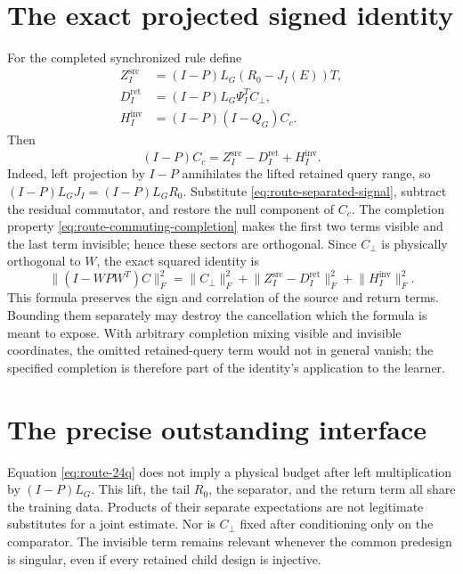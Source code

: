 \documentclass[11pt,oneside,openany,a4paper]{report}
\numberwithin{equation}{chapter}
\theoremstyle{definition}
\theoremstyle{remark}
\begin{document}
\section{The exact projected signed identity}

For the completed synchronized rule define
\begin{align*}
 Z_I^{\mathrm{src}}&=(I-P)L_G(R_0-J_I(E))T,\\
 D_I^{\mathrm{ret}}&=(I-P)L_G\Psi_I^TC_\perp,\\
 H_I^{\mathrm{inv}}&=(I-P)(I-Q_G)C_c.
\end{align*}
Then
\begin{equation}
 (I-P)C_c=Z_I^{\mathrm{src}}-D_I^{\mathrm{ret}}
                  +H_I^{\mathrm{inv}}.
 \label{eq:route-signed}
\end{equation}
Indeed, left projection by $I-P$ annihilates the lifted retained query
range, so $(I-P)L_GJ_I=(I-P)L_GR_0$.  Substitute
\eqref{eq:route-separated-signal}, subtract the residual commutator,
and restore the null component of $C_c$.  The completion property
\eqref{eq:route-commuting-completion} makes the first two terms visible
and the last term invisible; hence these sectors are orthogonal.
Since $C_\perp$ is physically orthogonal to $W$, the exact squared
identity is
\begin{equation}
 \lVert(I-WPW^T)C\rVert_F^2
 =\lVert C_\perp\rVert_F^2
  +\lVert Z_I^{\mathrm{src}}-D_I^{\mathrm{ret}}\rVert_F^2
  +\lVert H_I^{\mathrm{inv}}\rVert_F^2.
 \label{eq:route-signed-energy}
\end{equation}
This formula preserves the sign and correlation of the source and
return terms.  Bounding them separately may destroy the cancellation
which the formula is meant to expose.  With arbitrary completion
mixing visible and invisible coordinates, the omitted retained-query
term would not in general vanish; the specified completion is therefore
part of the identity's application to the learner.

\section{The precise outstanding interface}

Equation \eqref{eq:route-24q} does not imply a physical budget after
left multiplication by $(I-P)L_G$.  This lift, the tail $R_0$, the
separator, and the return term all share the training data.  Products
of their separate expectations are not legitimate substitutes for a
joint estimate.  Nor is $C_\perp$ fixed after conditioning only on the
comparator.  The invisible term remains relevant whenever the common
predesign is singular, even if every retained child design is injective.
\end{document}
